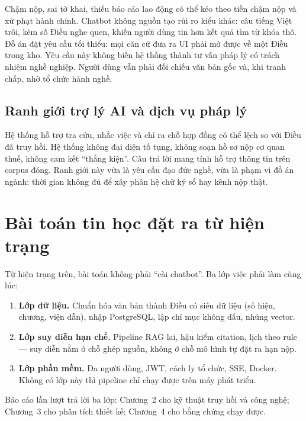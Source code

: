 Chậm nộp, sai tờ khai, thiếu báo cáo lao động có thể kéo theo tiền chậm nộp và
xử phạt hành chính. Chatbot không nguồn tạo rủi ro kiểu khác: câu tiếng Việt
trôi, kèm số Điều nghe quen, khiến người dùng tin hơn kết quả tìm từ khóa thô.
Đồ án đặt yêu cầu tối thiểu: mọi căn cứ đưa ra UI phải mở được về một Điều trong
kho. Yêu cầu này không biến hệ thống thành tư vấn pháp lý có trách nhiệm nghề
nghiệp. Người dùng vẫn phải đối chiếu văn bản gốc và, khi tranh chấp, nhờ tổ
chức hành nghề.

\subsection{Ranh giới trợ lý AI và dịch vụ pháp lý}

Hệ thống hỗ trợ tra cứu, nhắc việc và chỉ ra chỗ hợp đồng có thể lệch so với
Điều đã truy hồi. Hệ thống không đại diện tố tụng, không soạn hồ sơ nộp cơ quan
thuế, không cam kết ``thắng kiện''. Câu trả lời mang tính hỗ trợ thông tin trên
corpus đóng. Ranh giới này vừa là yêu cầu đạo đức nghề, vừa là phạm vi đồ án
ngành: thời gian không đủ để xây phân hệ chữ ký số hay kênh nộp thật.

\section{Bài toán tin học đặt ra từ hiện trạng}

Từ hiện trạng trên, bài toán không phải ``cài chatbot''. Ba lớp việc phải làm
cùng lúc:

\begin{enumerate}
    \item \textbf{Lớp dữ liệu.} Chuẩn hóa \soLuat{} văn bản thành Điều có siêu
    dữ liệu (số hiệu, chương, viện dẫn), nhập PostgreSQL, lập chỉ mục không dấu,
    nhúng vector.
    \item \textbf{Lớp suy diễn hạn chế.} Pipeline RAG lai, hậu kiểm citation,
    lịch theo rule --- suy diễn nằm ở chỗ ghép nguồn, không ở chỗ mô hình tự
    đặt ra hạn nộp.
    \item \textbf{Lớp phần mềm.} Đa người dùng, JWT, cách ly tổ chức, SSE, Docker.
    Không có lớp này thì pipeline chỉ chạy được trên máy phát triển.
\end{enumerate}

Báo cáo lần lượt trả lời ba lớp: Chương~2 cho kỹ thuật truy hồi và công nghệ;
Chương~3 cho phân tích thiết kế; Chương~4 cho bằng chứng chạy được.
